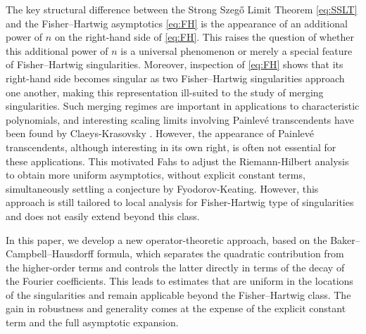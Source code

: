 \documentclass[11pt]{amsart}
\theoremstyle{plain}
\theoremstyle{remark}
\numberwithin{equation}{section}
\begin{document}
The key structural difference between the Strong Szeg\H{o} Limit Theorem
\eqref{eq:SSLT} and the Fisher--Hartwig asymptotics \eqref{eq:FH} is the
appearance of an additional power of $n$ on the right-hand side of
\eqref{eq:FH}. This raises the question of  whether this  
additional power of $n$ is a universal phenomenon or merely a special feature
of Fisher--Hartwig singularities. Moreover, inspection of \eqref{eq:FH} shows that its right-hand side becomes
singular as two Fisher--Hartwig singularities approach one another, making this
representation ill-suited to the study of merging singularities. Such merging regimes are important in applications to characteristic
polynomials, and interesting scaling limits involving Painlev\'e transcendents have been found by Claeys-Krasovsky \cite{ClaKra}. However, the appearance of Painlev\'e transcendents, although interesting in its own right, is often not essential for these applications. This motivated Fahs \cite{Fahs} to adjust the Riemann-Hilbert analysis to obtain more uniform asymptotics, without explicit constant terms, simultaneously settling a conjecture by Fyodorov-Keating. However, this approach is still tailored to local analysis for Fisher-Hartwig type of singularities and does not easily extend beyond this class.



 In this paper, we develop a new operator-theoretic approach, based on the Baker--Campbell--Hausdorff formula, which separates the quadratic contribution from the higher-order terms and controls the latter directly in terms of the decay of the Fourier coefficients. This leads to estimates that are uniform in the locations of the singularities and remain applicable beyond the Fisher--Hartwig class. The gain in robustness and generality comes at the expense of the explicit constant term and the full asymptotic expansion.
\end{document}
